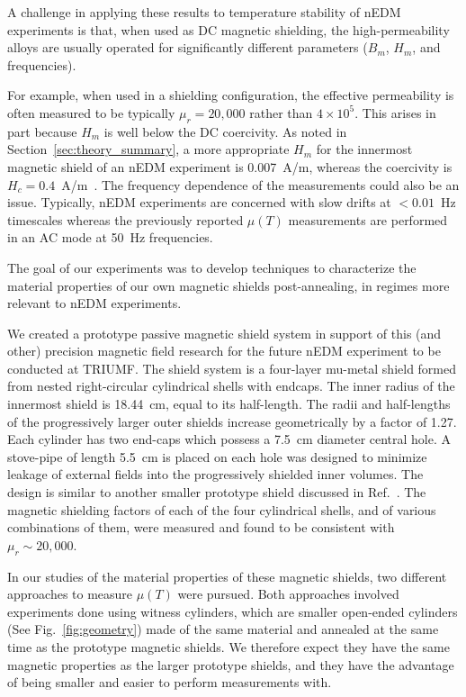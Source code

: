 \documentclass[review]{elsarticle}
\begin{document}
A challenge in applying these results to temperature stability of nEDM
experiments is that, when used as DC magnetic shielding, the
high-permeability alloys are usually operated for significantly
different parameters ($B_m$, $H_m$, and frequencies).

For example, when used in a shielding configuration, the effective
permeability is often measured to be typically $\mu_r=20,000$ rather
than $4\times 10^5$.  This arises in part because $H_m$ is well below
the DC coercivity.  As noted in Section~\ref{sec:theory_summary}, a
more appropriate $H_m$ for the innermost magnetic shield of an nEDM
experiment is 0.007~A/m, whereas the coercivity is
$H_c=0.4$~A/m~\cite{bib:kruppvdm}.  The frequency dependence of the
measurements could also be an issue.  Typically, nEDM experiments are
concerned with slow drifts at $<0.01$~Hz timescales whereas the
previously reported $\mu(T)$ measurements are performed in an AC mode
at 50~Hz frequencies.


The goal of our experiments was to develop techniques to characterize
the material properties of our own magnetic shields post-annealing, in
regimes more relevant to nEDM experiments.


We created a prototype passive magnetic shield system in support of
this (and other) precision magnetic field research for the future nEDM
experiment to be conducted at TRIUMF.  The shield system is a
four-layer mu-metal shield formed from nested right-circular
cylindrical shells with endcaps.  The inner radius of the innermost
shield is 18.44~cm, equal to its half-length. The radii and
half-lengths of the progressively larger outer shields increase
geometrically by a factor of 1.27.  Each cylinder has two end-caps
which possess a 7.5~cm diameter central hole.  A stove-pipe of length
5.5~cm is placed on each hole was designed to minimize leakage of
external fields into the progressively shielded inner volumes.  The
design is similar to another smaller prototype shield discussed in
Ref.~\cite{bib:nmorpaper}.  The magnetic shielding factors of each of
the four cylindrical shells, and of various combinations of them, were
measured and found to be consistent with $\mu_r\sim 20,000$.

In our studies of the material properties of these magnetic shields,
two different approaches to measure $\mu(T)$ were pursued.  Both
approaches involved experiments done using witness cylinders, which
are smaller open-ended cylinders (See Fig.~\ref{fig:geometry}) made of
the same material and annealed at the same time as the prototype
magnetic shields.  We therefore expect they have the same magnetic
properties as the larger prototype shields, and they have the
advantage of being smaller and easier to perform measurements with.
\end{document}
